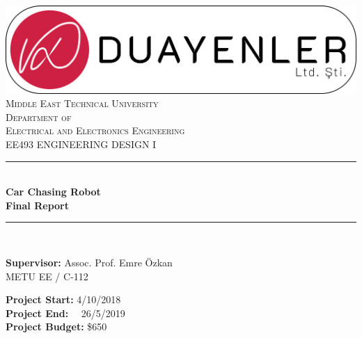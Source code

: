 \documentclass[a4paper,12pt]{article}
\begin{document}
\begin{titlepage}
		
		\newcommand{\HRule}{\rule{\linewidth}{0.5mm}} %
		\centering 
		
		\includegraphics[width=\textwidth,height=\textheight,keepaspectratio]{../../documents/logos/logo3-with-stroke}\\[0.5cm]
		
		\textsc{\LARGE Middle East Technical University}\\[0.5cm] %
		\textsc{\Large Department of \\Electrical and Electronics Engineering }\\[0.5cm] %
		\textsc{\large EE493 ENGINEERING DESIGN I}\\[0.5cm] %
		
		
		\HRule \\[0cm]
		{ \huge \bfseries  Car Chasing Robot\\[0.1cm] \LARGE \bfseries Final Report}\\[0cm] %
		\HRule \\[1cm]
		
		\begin{minipage}[l]{0.6\textwidth}
			\raggedright
			\large{\textbf{Supervisor:}}	Assoc. Prof. Emre Özkan \\
			\hspace{3.05cm}  METU EE / C-112
			
		\end{minipage}
		\begin{minipage}[r]{0.35\textwidth}
			\raggedright
			\textbf{Project Start:} 4/10/2018\\
			\textbf{Project End:} \ \  26/5/2019\\
			\textbf{Project Budget:} \$650
			

\end{minipage}
\end{titlepage}
\end{document}

